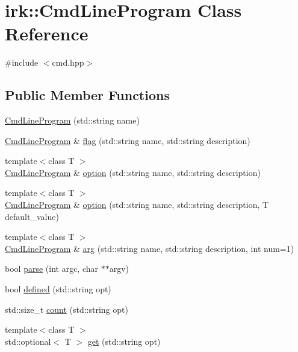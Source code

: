 \hypertarget{classirk_1_1CmdLineProgram}{}\section{irk\+:\+:Cmd\+Line\+Program Class Reference}
\label{classirk_1_1CmdLineProgram}


{\ttfamily \#include $<$cmd.\+hpp$>$}

\subsection*{Public Member Functions}
\begin{DoxyCompactItemize}
\item 
\mbox{\hyperlink{classirk_1_1CmdLineProgram_a92cbb83b26d6b110afea86f79527c9a2}{Cmd\+Line\+Program}} (std\+::string name)
\item 
\mbox{\hyperlink{classirk_1_1CmdLineProgram}{Cmd\+Line\+Program}} \& \mbox{\hyperlink{classirk_1_1CmdLineProgram_a41dca1110a88601252d1d1786c7900f1}{flag}} (std\+::string name, std\+::string description)
\item 
{\footnotesize template$<$class T $>$ }\\\mbox{\hyperlink{classirk_1_1CmdLineProgram}{Cmd\+Line\+Program}} \& \mbox{\hyperlink{classirk_1_1CmdLineProgram_af0581fcbc3b764d916de140254a8603c}{option}} (std\+::string name, std\+::string description)
\item 
{\footnotesize template$<$class T $>$ }\\\mbox{\hyperlink{classirk_1_1CmdLineProgram}{Cmd\+Line\+Program}} \& \mbox{\hyperlink{classirk_1_1CmdLineProgram_ad8ea0014deb5d0c7cada6dfbdd55fd19}{option}} (std\+::string name, std\+::string description, T default\+\_\+value)
\item 
{\footnotesize template$<$class T $>$ }\\\mbox{\hyperlink{classirk_1_1CmdLineProgram}{Cmd\+Line\+Program}} \& \mbox{\hyperlink{classirk_1_1CmdLineProgram_a838fd64b3f1f5648e60e5f96afc3a57f}{arg}} (std\+::string name, std\+::string description, int num=1)
\item 
bool \mbox{\hyperlink{classirk_1_1CmdLineProgram_aa19c7e41705d5201da87a03037c9303d}{parse}} (int argc, char $\ast$$\ast$argv)
\item 
bool \mbox{\hyperlink{classirk_1_1CmdLineProgram_a32b7dc6feec23108ead5e4e170bbdb07}{defined}} (std\+::string opt)
\item 
std\+::size\+\_\+t \mbox{\hyperlink{classirk_1_1CmdLineProgram_aa6ab122c6b5e5a64bc3d616056f8aa22}{count}} (std\+::string opt)
\item 
{\footnotesize template$<$class T $>$ }\\std\+::optional$<$ T $>$ \mbox{\hyperlink{classirk_1_1CmdLineProgram_a41436648216b1ac69844f281949e4918}{get}} (std\+::string opt)
\end{DoxyCompactItemize}


